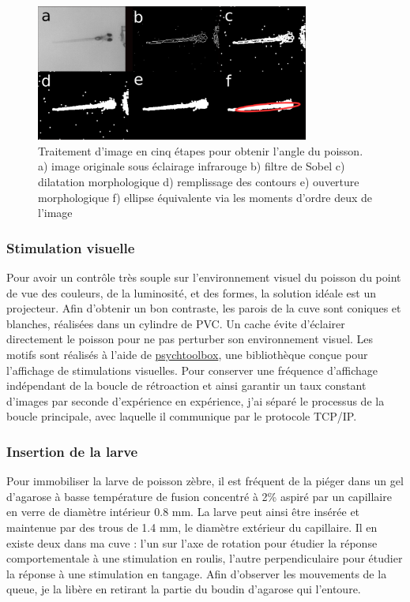 \begin{figure}
\centering
\includegraphics[width=0.8\textwidth]{./files/image_process.png}
\caption{Traitement d'image en cinq étapes pour obtenir l'angle du poisson. a) image originale sous éclairage infrarouge b) filtre de Sobel c) dilatation morphologique d) remplissage des contours e) ouverture morphologique f) ellipse équivalente via les moments d'ordre deux de l'image}
\end{figure}


\subsubsection{Stimulation visuelle}
Pour avoir un contrôle très souple sur l'environnement visuel du poisson du point de vue des couleurs, de la luminosité, et des formes, la solution idéale est un projecteur. Afin d'obtenir un bon contraste, les parois de la cuve sont coniques et blanches, réalisées dans un cylindre de PVC. Un cache évite d'éclairer directement le poisson pour ne pas perturber son environnement visuel. Les motifs sont réalisés à l'aide de \href{http://psychtoolbox.org/}{psychtoolbox}, une bibliothèque conçue pour l'affichage de stimulations visuelles. Pour conserver une fréquence d'affichage indépendant de la boucle de rétroaction et ainsi garantir un taux constant d'images par seconde d'expérience en expérience, j'ai séparé le processus de la boucle principale, avec laquelle il communique par le protocole TCP/IP.

\subsubsection{Insertion de la larve}
Pour immobiliser la larve de poisson zèbre, il est fréquent de la piéger dans un gel d'agarose à basse température de fusion concentré à 2\% aspiré par un capillaire en verre de diamètre intérieur 0.8 mm. La larve peut ainsi être insérée et maintenue par des trous de 1.4 mm, le diamètre extérieur du capillaire. Il en existe deux dans ma cuve : l'un sur l'axe de rotation pour étudier la réponse comportementale à une stimulation en roulis, l'autre perpendiculaire pour étudier la réponse à une stimulation en tangage. Afin d'observer les mouvements de la queue, je la libère en retirant la partie du boudin d'agarose qui l'entoure. 

